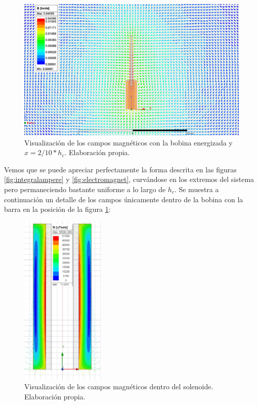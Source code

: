 \begin{figure}[H]
    \centering
    \includegraphics[width=\linewidth]{FigurasMemoria/fields8.PNG}
    \caption{Visualización de los campos magnéticos con la bobina energizada y \(x=2/10 * h_c\). Elaboración propia.}
    \label{fig:fields8} %
\end{figure}

Vemos que se puede apreciar perfectamente la forma descrita en las figuras \ref{fig:integralampere} y \ref{fig:electromagnet}, curvándose en los extremos del sistema pero permaneciendo bastante uniforme a lo largo de \(h_c\). Se muestra a continuación un detalle de los campos únicamente dentro de la bobina con la barra en la posición de la figura \ref{fig:fields8}:

\begin{figure}[H]
    \centering
    \includegraphics[width=4cm]{FigurasMemoria/fieldsDetail.jpg}
    \caption{Visualización de los campos magnéticos dentro del solenoide. Elaboración propia.}
    \label{fig:fieldsDetail} %
\end{figure}

